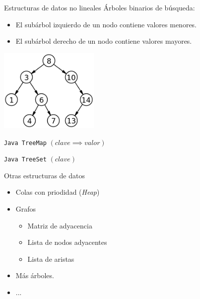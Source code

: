 \documentclass[10pt,handout]{beamer}
\begin{document}
\begin{frame}{Estructuras de datos no lineales}
  Árboles binarios de búsqueda:
  \begin{itemize}
  \item El subárbol izquierdo de un nodo contiene valores menores.
  \item El subárbol derecho de un nodo contiene valores mayores.
  \end{itemize}
  \centering \includegraphics[height=4cm]{bst.png}

  \texttt{Java TreeMap} $(clave \implies valor)$

  \texttt{Java TreeSet} $(clave)$
\end{frame}

\begin{frame}{Otras estructuras de datos}
  \begin{itemize}
  \item Colas con priodidad (\emph{Heap})
  \item Grafos
    \begin{itemize}
    \item Matriz de adyacencia
    \item Lista de nodos adyacentes
    \item Lista de aristas
    \end{itemize}
  \item Más árboles.
  \item ...
  \end{itemize}
\end{frame}
\end{document}
